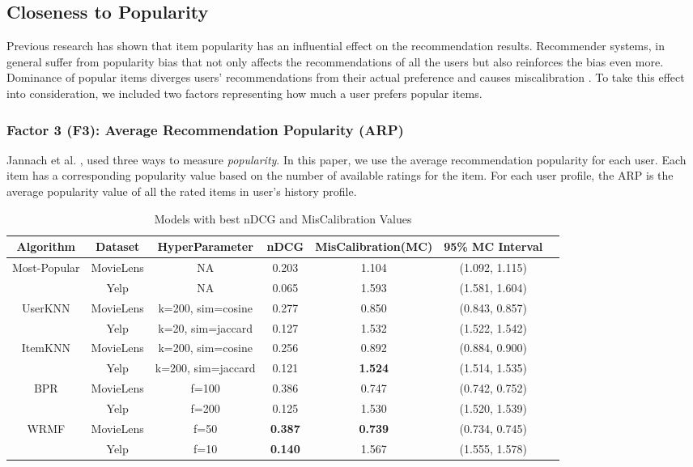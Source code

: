 \subsection{Closeness to Popularity}

Previous research has shown that item popularity has an influential effect on the recommendation results. Recommender systems, in general suffer from popularity bias \cite{jannach2015recommenders} that not only affects the recommendations of all the users but also reinforces the bias even more. Dominance of popular items diverges users' recommendations from their actual preference and causes miscalibration \cite{abdollahpouri2019impact}. To take this effect into consideration, we included two factors representing how much a user prefers popular items.


\subsubsection{Factor 3 (F3): Average Recommendation Popularity (ARP)}
Jannach et al. \cite{jannach2013recommenders}, used three ways to measure \textit{popularity}. In this paper, we use the average recommendation popularity for each user. Each item has a corresponding popularity value based on the number of available ratings for the item. For each user profile, the ARP is the average popularity value of all the rated items in user's history profile.

\begin{table*}[!h]
    \centering
    \begin{tabular}{c c c c c c c} \hline
    \textbf{Algorithm} &\textbf{Dataset} &\textbf{HyperParameter} &\textbf{nDCG} &\textbf{MisCalibration(MC)} &\textbf{95\% MC Interval} \\ \hline
    Most-Popular & MovieLens & NA & 0.203 & 1.104 & (1.092, 1.115)\\ 
                & Yelp & NA & 0.065 & 1.593 & (1.581, 1.604)\\ \hline
    UserKNN & MovieLens & k=200, sim=cosine & 0.277 & 0.850 & (0.843, 0.857)\\ 
            & Yelp & k=20, sim=jaccard & 0.127 & 1.532 & (1.522, 1.542)\\ \hline
    ItemKNN & MovieLens & k=200, sim=cosine & 0.256 & 0.892 & (0.884, 0.900)\\ 
            & Yelp & k=200, sim=jaccard & 0.121 & \textbf{1.524} & (1.514, 1.535)\\ \hline
    BPR & MovieLens & f=100 & 0.386 & 0.747 & (0.742, 0.752)\\ 
        & Yelp & f=200 & 0.125 & 1.530 & (1.520, 1.539) \\ \hline
    WRMF & MovieLens & f=50 & \textbf{0.387} & \textbf{0.739} & (0.734, 0.745)\\ 
         & Yelp & f=10 & \textbf{0.140} & 1.567 & (1.555, 1.578)\\ \hline
    \end{tabular}
    \caption{Models with best nDCG and MisCalibration Values}
    \label{tab:ndcg/mc}
\end{table*}

